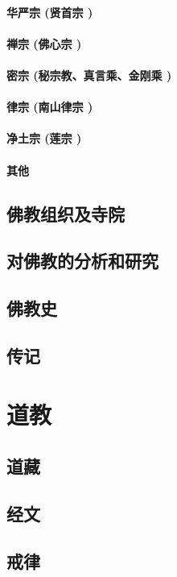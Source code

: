 \documentclass[UTF8]{../RepresentationUniverse}
\begin{document}
\subsubsection{华严宗 (贤首宗 )}
\subsubsection{禅宗 (佛心宗 )}
\subsubsection{密宗 (秘宗教、真言乘、金刚乘 )}
\subsubsection{律宗 (南山律宗 )}
\subsubsection{净土宗 (莲宗 )}
\subsubsection{其他}

\section{佛教组织及寺院}
\section{对佛教的分析和研究}
\section{佛教史}
\section{传记}


\chapter{道教}
\section{道藏}
\section{经文}
\section{戒律}
\end{document}
